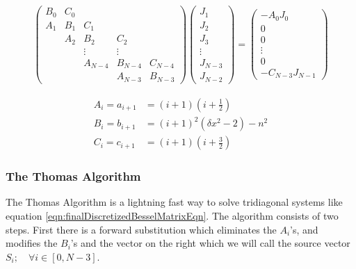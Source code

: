 \documentclass[onecolumn, groupedaddress, 10pt]{revtex4-1}
\begin{document}
\begin{align}
\label{eqn:finalDiscretizedBesselMatrixEqn}
\left( \begin{array}{ccccc}
	B_0 & C_0 &         &         &         \\
	A_1 & B_1 &   C_1   &         &         \\
	    & A_2 &   B_2   &   C_2   &         \\
	    &     & \vdots  & \vdots  &         \\
	    &     & A_{N-4} & B_{N-4} & C_{N-4} \\
	    &     &         & A_{N-3} & B_{N-3}
\end{array} \right)
\left( \begin{array}{c}
	  J_1   \\
	  J_2   \\
	  J_3   \\
	\vdots  \\
	J_{N-3} \\
	J_{N-2}
\end{array} \right)
=
\left( \begin{array}{c}
	    - A_0 J_0     \\
	        0         \\
	        0         \\
	     \vdots       \\
	        0         \\
	- C_{N-3} J_{N-1}
\end{array} \right)
\end{align}

\begin{align}
A_i = a_{i+1} &= (i+1)   \left( i + \frac{1}{2} \right)				\\
B_i = b_{i+1} &= (i+1)^2 \left( \delta x^2 - 2  \right) - n^2			\\
C_i = c_{i+1} &= (i+1)   \left( i + \frac{3}{2} \right)
\end{align}

\subsubsection{The Thomas Algorithm}
The Thomas Algorithm is a lightning fast way to solve tridiagonal systems like equation \ref{eqn:finalDiscretizedBesselMatrixEqn}.  The algorithm consists of two steps.  First there is a forward substitution which eliminates the $A_i$'s, and modifies the $B_i$'s and the vector on the right which we will call the source vector $S_i; \quad \forall i \in [0, N-3]$.
\end{document}
